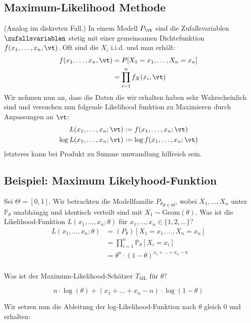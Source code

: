 \subsection{Maximum-Likelihood Methode}
(Analog im diskreten Fall.) In einem Modell $P_\vt$ sind die Zufallsvariablen
$\zufallsvariablen$ stetig mit einer gemeinsamen Dichtefunktion
$f (x_1, \dots, x_n, \vt)$. Oft sind die $X_i$ i.i.d. und man erhält:
\begin{align*}
  f (x_1, \dots, x_n, \vt) & = P[X_1 = x_1, \dots, X_n = x_n] \\
                           & = \prod_{i = 1}^n f_X (x_i, \vt)
\end{align*}
Wir nehmen nun an, dass die Daten die wir erhalten haben sehr
Wahrscheinlich sind und versuchen nun folgende Likelihood funktion
zu Maximieren durch Anpassungen an $\vt$:
\begin{align*}
  L (x_1, \dots, x_n; \vt)      & := f (x_1, \dots, x_n; \vt)      \\
  \log L (x_1, \dots, x_n; \vt) & := \log f (x_1, \dots, x_n; \vt)
\end{align*}
letzteres kann bei Produkt zu Summe umwandlung hilfreich sein.
\BoxStart{}
\subsection{Beispiel: Maximum Likelyhood-Funktion}
Sei $\Theta = [0, 1]$. Wir betrachten die Modellfamilie $ {P_\theta}_{\theta \in \Theta}$, wobei $X_1, \ldots, X_n$ unter $\mathbb{P}_\theta$ unabhängig und identisch verteilt sind mit $X_1 \sim \text{Geom} (\theta)$. Was ist die Likelihood-Funktion $L (x_1, \ldots, x_n; \theta)$ für $x_1, \ldots, x_n \in \{1, 2, \ldots\}$?
\begin{align*}
  L (x_1, \ldots, x_n; \theta) & =  (P_\theta) [X_1 = x_1,\ldots , X_n = x_n]            \\
                               & =\prod_{i = 1}^n \mathbb{P}_\theta[X_i = x_i]           \\
                               & = \theta^n \cdot  {(1 - \theta)}^{x_1 + \ldots + x_n - n}
\end{align*}
\\
Was ist der Maximum-Likelihood-Schätzer $T_{\text{ML}}$ für $\theta$?

\[
  n \cdot \log (\theta) +  (x_1 + \ldots + x_n - n) \cdot \log (1 - \theta)
\]

Wir setzen nun die Ableitung der log-Likelihood-Funktion nach $\theta$ gleich
$0$ und erhalten:

